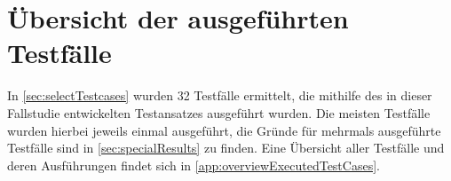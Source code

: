 \section{Übersicht der ausgeführten Testfälle}
\label{sec:overviewExecTestCases}

In \autoref{sec:selectTestcases} wurden 32 Testfälle ermittelt, die mithilfe des in dieser Fallstudie entwickelten Testansatzes ausgeführt wurden.
Die meisten Testfälle wurden hierbei jeweils einmal ausgeführt, die Gründe für mehrmals ausgeführte Testfälle sind in \autoref{sec:specialResults} zu finden.
Eine Übersicht aller Testfälle und deren Ausführungen findet sich in \autoref{app:overviewExecutedTestCases}.

